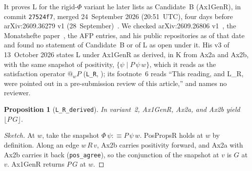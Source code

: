 \documentclass[11pt,a4paper]{article}
\newcommand{\valid}[1]{\lfloor #1 \rfloor}
\newcommand{\lean}[1]{\texttt{#1}}
\newtheorem{proposition}[theorem]{Proposition}
\theoremstyle{definition}
\theoremstyle{remark}
\begin{document}
It proves L for the rigid-\(\Phi\) variant he later lists as Candidate~B (Ax1GenR), in commit \lean{27524f7}, merged 24~September 2026 (20:51~UTC), four days before arXiv:2609.36279 v1 (28~September)~\cite{benzmuellerPWN2026}.
We checked arXiv:2609.26806 v1~\cite{benzmuellerLean2026}, the Monatshefte paper~\cite{benzmuellerScott2025}, the AFP entries, and his public repositories as of that date and found no statement of Candidate~B or of L as open under it.
His v3 of 13~October 2026 states L under Ax1GenR as derived, in K from Ax2a and Ax2b, with the same snapshot of positivity, \(\{\psi \mid P\,\psi\,w\}\), which it reads as the satisfaction operator \(@_w P\) (\lean{L\_R}, \cite[v3, Sect.~6.4.3]{benzmuellerPWN2026}); its footnote~6 reads ``This reading, and L\_R, were pointed out in a pre-submission review of this article,'' and names no reviewer.

\begin{proposition}[\lean{L\_R\_derived}]
\label{prop:LR}
In variant~2, Ax1GenR, Ax2a, and Ax2b yield \(\valid{P\,G}\).
\end{proposition}

\begin{proof}[Sketch]
At \(w\), take the snapshot \(\Phi\,\psi :\equiv P\,\psi\,w\).
PosPropsR holds at \(w\) by definition.
Along an edge \(w\,R\,v\), Ax2b carries positivity forward, and Ax2a with
Ax2b carries it back (\lean{pos\_agree}), so the conjunction of the snapshot
at \(v\) is \(G\) at \(v\).
Ax1GenR returns \(P\,G\) at \(w\).
\end{proof}
\end{document}
